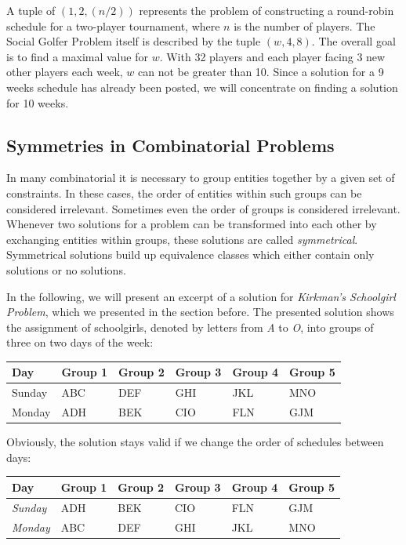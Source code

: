 \documentclass[a4paper]{scrartcl}
\begin{document}
A tuple of $(1,2,(n/2))$ represents the problem of constructing a round-robin schedule for a two-player tournament, where $n$ is the number of players. The Social Golfer Problem itself is described by the tuple $(w,4,8)$. The overall goal is to find a maximal value for $w$. With 32 players and each player facing 3 new other players each week, $w$ can not be greater than 10. Since a solution for a 9 weeks schedule has already been posted, we will concentrate on finding a solution for 10 weeks.

\subsection{Symmetries in Combinatorial Problems}

In many combinatorial it is necessary to group entities together by a given set of constraints. In these cases, the order of entities within such groups can be considered irrelevant. Sometimes even the order of groups is considered irrelevant. Whenever two solutions for a problem can be transformed into each other by exchanging entities within groups, these solutions are called \emph{symmetrical}. Symmetrical solutions build up equivalence classes which either contain only solutions or no solutions\cite{Smith01}.

In the following, we will present an excerpt of a solution for \emph{Kirkman's Schoolgirl Problem}, which we presented in the section before. The presented solution shows the assignment of schoolgirls, denoted by letters from \emph{A} to \emph{O}, into groups of three on two days of the week:

\begin{table}[h]
\centering
\begin{tabular}{ l | l  l  l l  l }
Day & Group 1 & Group 2 & Group 3 & Group 4 & Group 5 \\
\hline
Sunday & ABC & DEF & GHI & JKL & MNO \\
Monday & ADH  & BEK & CIO & FLN & GJM \\
\end{tabular}
\end{table}

Obviously, the solution stays valid if we change the order of schedules between days:

\begin{table}[h]
\centering
\begin{tabular}{ l | l  l  l l  l }
Day & Group 1 & Group 2 & Group 3 & Group 4 & Group 5 \\
\hline
\emph{Sunday} & ADH  & BEK & CIO & FLN & GJM \\
\emph{Monday} & ABC & DEF & GHI & JKL & MNO \\
\end{tabular}
\end{table}
\end{document}

